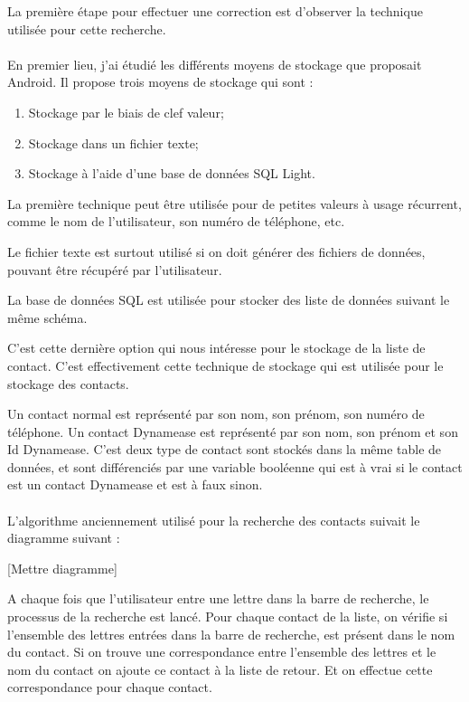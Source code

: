 La première étape pour effectuer une correction est d'observer la technique utilisée pour cette recherche.\\\\

En premier lieu, j'ai étudié les différents moyens de stockage que proposait Android. Il propose trois moyens de stockage qui sont :

\begin{enumerate}
	\item Stockage par le biais de clef valeur;
	\item Stockage dans un fichier texte;
	\item Stockage à l'aide d'une base de données SQL Light.
\end{enumerate}

La première technique peut être utilisée pour de petites valeurs à usage récurrent, comme le nom de l'utilisateur, son numéro de téléphone, etc.

Le fichier texte est surtout utilisé si on doit générer des fichiers de données, pouvant être récupéré par l'utilisateur.

La base de données SQL est utilisée pour stocker des liste de données suivant le même schéma.

C'est cette dernière option qui nous intéresse pour le stockage de la liste de contact. C'est effectivement cette technique de stockage qui est utilisée pour le stockage des contacts.

Un contact normal est représenté par son nom, son prénom, son numéro de téléphone. Un contact Dynamease est représenté par son nom, son prénom et son Id Dynamease. C'est deux type de contact sont stockés dans la même table de données, et sont différenciés par une variable booléenne qui est à vrai si le contact est un contact Dynamease et est à faux sinon.\\\\

L'algorithme anciennement utilisé pour la recherche des contacts suivait le diagramme suivant :

[Mettre diagramme]

A chaque fois que l'utilisateur entre une lettre dans la barre de recherche, le processus de la recherche est lancé. Pour chaque contact de la liste, on vérifie si l'ensemble des lettres entrées dans la barre de recherche, est présent dans le nom du contact. Si on trouve une correspondance entre l'ensemble des lettres et le nom du contact on ajoute ce contact à la liste de retour. Et on effectue cette correspondance pour chaque contact.


